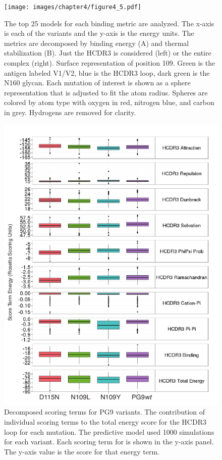 \begin{figure}[!t]
   \centering
   \texttt{[image: images/chapter4/figure4\_5.pdf]} %
   \caption[Predictive Models of PG9 Variants that Enhanced Binding]{The top 25 models for each binding metric are analyzed. The x-axis is each of the variants and the y-axis is the \rosetta energy units. The metrics are decomposed by binding energy (A) and thermal stabilization (B). Just the HCDR3 is considered (left) or the entire complex (right). Surface representation of position 109. Green is the antigen labeled V1/V2, blue is the HCDR3 loop, dark green is the N160 glycan. Each mutation of interest is shown as a sphere representation that is adjusted to fit the \rosetta atom radius. Spheres are colored by atom type with oxygen in red, nitrogen blue, and carbon in grey. Hydrogens are removed for clarity.}
   \label{fig:figure4_5}
\end{figure}


\begin{figure}[!t]
   \centering
   \includegraphics[scale=1.4]{images/chapter4/figure4_6.pdf} %
   \caption[Decomposed Scoring Terms for PG9 Variants]{Decomposed scoring terms for PG9 variants. The contribution of individual scoring terms to the total energy score for the HCDR3 loop for each mutation. The predictive model used 1000 simulations for each variant. Each scoring term for \rosetta is shown in the y-axis panel. The y-axis value is the score for that energy term.}
   \label{fig:figure4_6}
\end{figure}


